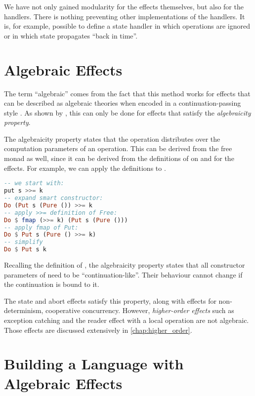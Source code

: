 We have not only gained modularity for the effects themselves, but also for the handlers. There is nothing preventing other implementations of the handlers. It is, for example, possible to define a state handler in which  operations are ignored or in which state propagates ``back in time''.

\section{Algebraic Effects}

The term ``algebraic'' comes from the fact that this method works for effects that can be described as algebraic theories when encoded in a continuation-passing style \autocite{goos_adequacy_2001}. As shown by \textcite{plotkin_algebraic_2003}, this can only be done for effects that satisfy the \emph{algebraicity property}.

The algebraicity property states that the \hs{>>=} operation distributes over the computation parameters of an operation. This can be derived from the free monad as well, since it can be derived from the definitions of \hs{>>=} on  and  for the effects. For example, we can apply the definitions to .

\begin{lstlisting}[language=haskell,style=fancy]
-- we start with:
put s >>= k
-- expand smart constructor:
Do (Put s (Pure ()) >>= k
-- apply >>= definition of Free:
Do $ fmap (>>= k) (Put s (Pure ()))
-- apply fmap of Put:
Do $ Put s (Pure () >>= k)
-- simplify
Do $ Put s k
\end{lstlisting}

Recalling the definition of , the algebraicity property states that all constructor parameters of  need to be ``continuation-like''. Their behaviour cannot change if the continuation is bound to it.

The state and abort effects satisfy this property, along with effects for non-determinism, cooperative concurrency. However, \emph{higher-order effects} such as exception catching and the reader effect with a local operation are not algebraic. Those effects are discussed extensively in \cref{chap:higher_order}.

\section{Building a Language with Algebraic Effects}

